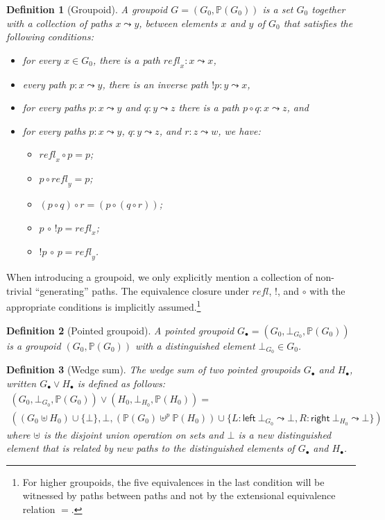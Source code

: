 \documentclass[11pt]{article}
\newtheorem{definition}{Definition}
\newcommand{\union}{\cup}
\newcommand{\refl}{\mathit{refl}}
\renewcommand{\path}{\leadsto}
\newcommand{\paths}[1]{\mathds{P}(#1)}
\newcommand{\leftv}[1]{\textsf{left}~#1}
\newcommand{\rightv}[1]{\textsf{right}~#1}
\newcommand{\wedgesum}{\vee}
\begin{document}
\begin{definition}[Groupoid]
A \emph{groupoid} $G = (G_0, \paths{G_0})$ is a set $G_0$ together
with a collection of paths $x \path y$, between elements $x$ and $y$ of $G_0$
that satisfies the following conditions:
\begin{itemize}
\item for every $x \in G_0$, there is a path $\refl_x : x \path x$,
\item every path $p : x \path y$, there is an inverse path $! p : y \path x$, 
\item for every paths $p : x \path y$ and $q : y \path z$ there is a path $p
  \circ q : x \path z$, and
\item for every paths $p : x \path y$, $q : y \path z$, and $r : z \path w$,
  we have:
  \begin{itemize}
  \item $\refl_x \circ p = p$;
  \item $p \circ \refl_y = p$;
  \item $(p \circ q) \circ r = (p \circ (q \circ r))$;
  \item $p \,\circ\, !p = \refl_x$;
  \item $!p \,\circ\, p = \refl_y$.
  \end{itemize}
\end{itemize}
\end{definition}
When introducing a groupoid, we only explicitly mention a collection of
non-trivial ``generating'' paths. The equivalence closure under $\refl$, $!$,
and $\circ$ with the appropriate conditions is implicitly
assumed.\footnote{For higher groupoids, the five equivalences in the last
  condition will be witnessed by paths between paths and not by the
  extensional equivalence relation $=$.}

\begin{definition}[Pointed groupoid]
A pointed groupoid $G_{\bullet} = (G_0, \bot_{G_0}, \paths{G_0})$ is
a groupoid $(G_0, \paths{G_0})$ with a distinguished element
$\bot_{G_0} \in G_0$.
\end{definition}

\begin{definition}[Wedge sum]
The \emph{wedge sum} of two pointed groupoids $G_\bullet$ and $H_\bullet$,
written $G_\bullet \wedgesum H_\bullet$ is defined as follows:
\[\begin{array}{l}
(G_0, \bot_{G_0}, \paths{G_0}) \wedgesum 
(H_0, \bot_{H_0}, \paths{H_0}) = \\
((G_0 \uplus H_0) \union \{ \bot \},
 \bot,
 (\paths{G_0} \uplus^p \paths{H_0}) \union
 \{ L: \leftv{\bot_{G_0}} \path \bot, 
    R: \rightv{\bot_{H_0}} \path \bot \})
\end{array}\]
where $\uplus$ is the disjoint union operation on sets and $\bot$ is a new
distinguished element that is related by new paths to the distinguished
elements of $G_\bullet$ and $H_\bullet$.
\end{definition}
\end{document}
